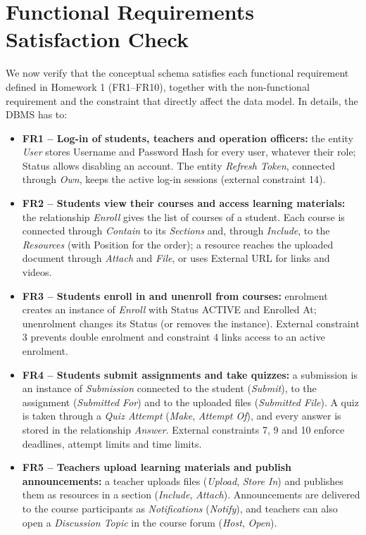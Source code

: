 \section{Functional Requirements Satisfaction Check}
We now verify that the conceptual schema satisfies each functional requirement defined in Homework 1 (FR1--FR10), together with the non-functional requirement and the constraint that directly affect the data model. In details, the DBMS has to:
\begin{itemize}
    \item \textbf{FR1 -- Log-in of students, teachers and operation officers:} the entity \textit{User} stores Username and Password Hash for every user, whatever their role; Status allows disabling an account. The entity \textit{Refresh Token}, connected through \textit{Own}, keeps the active log-in sessions (external constraint 14).

    \item \textbf{FR2 -- Students view their courses and access learning materials:} the relationship \textit{Enroll} gives the list of courses of a student. Each course is connected through \textit{Contain} to its \textit{Sections} and, through \textit{Include}, to the \textit{Resources} (with Position for the order); a resource reaches the uploaded document through \textit{Attach} and \textit{File}, or uses External URL for links and videos.

    \item \textbf{FR3 -- Students enroll in and unenroll from courses:} enrolment creates an instance of \textit{Enroll} with Status ACTIVE and Enrolled At; unenrolment changes its Status (or removes the instance). External constraint 3 prevents double enrolment and constraint 4 links access to an active enrolment.

    \item \textbf{FR4 -- Students submit assignments and take quizzes:} a submission is an instance of \textit{Submission} connected to the student (\textit{Submit}), to the assignment (\textit{Submitted For}) and to the uploaded files (\textit{Submitted File}). A quiz is taken through a \textit{Quiz Attempt} (\textit{Make}, \textit{Attempt Of}), and every answer is stored in the relationship \textit{Answer}. External constraints 7, 9 and 10 enforce deadlines, attempt limits and time limits.

    \item \textbf{FR5 -- Teachers upload learning materials and publish announcements:} a teacher uploads files (\textit{Upload}, \textit{Store In}) and publishes them as resources in a section (\textit{Include}, \textit{Attach}). Announcements are delivered to the course participants as \textit{Notifications} (\textit{Notify}), and teachers can also open a \textit{Discussion Topic} in the course forum (\textit{Host}, \textit{Open}).


\end{itemize}
